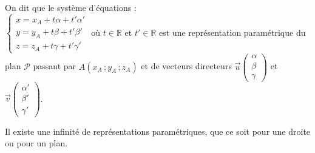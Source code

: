 \documentclass{cornouaille}
\begin{document}
\begin{definition}
  On dit que le système d'équations :
  \\$\begin{cases}x=x_A+t\alpha+t'\alpha'
    \\y=y_A+t\beta +t'\beta' \\z=z_A+t\gamma +t'\gamma'
  \end{cases}$ où $t\in\mathbb{R}$ et
  $t'\in\mathbb{R}$
  est une représentation paramétrique du plan $\mathscr{P}$
  passant par $A(x_A\,;y_A\,;z_A)$ et de vecteurs directeurs $\vec{u}
  \begin {pmatrix} \alpha\\\beta\\\gamma \end{pmatrix}$ et
  $\vec{v} \begin {pmatrix} \alpha'\\\beta'\\\gamma' \end{pmatrix}$.
\end{definition}



\begin{remarque}
  Il existe une infinité de représentations paramétriques, que ce soit
  pour une droite ou pour un plan.
\end{remarque}
\end{document}
